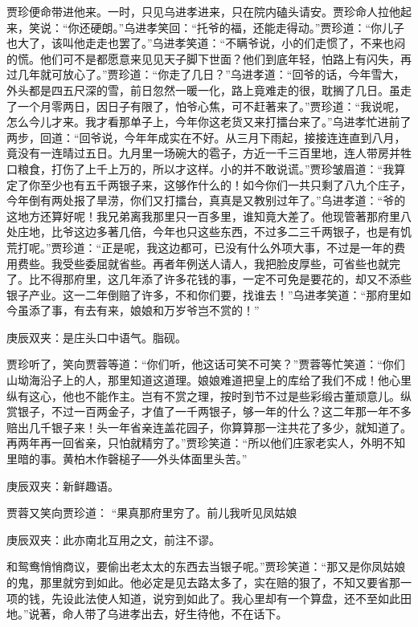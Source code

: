 \begin{parag}
    贾珍便命带进他来。一时，只见乌进孝进来，只在院内磕头请安。贾珍命人拉他起来，笑说：“你还硬朗。”乌进孝笑回：“托爷的福，还能走得动。”贾珍道：“你儿子也大了，该叫他走走也罢了。”乌进孝笑道：“不瞒爷说，小的们走惯了，不来也闷的慌。他们可不是都愿意来见见天子脚下世面？他们到底年轻，怕路上有闪失，再过几年就可放心了。”贾珍道：“你走了几日？”乌进孝道：“回爷的话，今年雪大，外头都是四五尺深的雪，前日忽然一暖一化，路上竟难走的很，耽搁了几日。虽走了一个月零两日，因日子有限了，怕爷心焦，可不赶著来了。”贾珍道：“我说呢，怎么今儿才来。我才看那单子上，今年你这老货又来打擂台来了。”乌进孝忙进前了两步，回道：“回爷说，今年年成实在不好。从三月下雨起，接接连连直到八月，竟没有一连晴过五日。九月里一场碗大的雹子，方近一千三百里地，连人带房并牲口粮食，打伤了上千上万的，所以才这样。小的并不敢说谎。”贾珍皱眉道：“我算定了你至少也有五千两银子来，这够作什么的！如今你们一共只剩了八九个庄子，今年倒有两处报了旱涝，你们又打擂台，真真是又教别过年了。”乌进孝道：“爷的这地方还算好呢！我兄弟离我那里只一百多里，谁知竟大差了。他现管著那府里八处庄地，比爷这边多著几倍，今年也只这些东西，不过多二三千两银子，也是有饥荒打呢。”贾珍道：“正是呢，我这边都可，已没有什么外项大事，不过是一年的费用费些。我受些委屈就省些。再者年例送人请人，我把脸皮厚些，可省些也就完了。比不得那府里，这几年添了许多花钱的事，一定不可免是要花的，却又不添些银子产业。这一二年倒赔了许多，不和你们要，找谁去！”乌进孝笑道：“那府里如今虽添了事，有去有来，娘娘和万岁爷岂不赏的！”\begin{note}庚辰双夹：是庄头口中语气。脂砚。\end{note}贾珍听了，笑向贾蓉等道：“你们听，他这话可笑不可笑？”贾蓉等忙笑道：“你们山坳海沿子上的人，那里知道这道理。娘娘难道把皇上的库给了我们不成！他心里纵有这心，他也不能作主。岂有不赏之理，按时到节不过是些彩缎古董顽意儿。纵赏银子，不过一百两金子，才值了一千两银子，够一年的什么？这二年那一年不多赔出几千银子来！头一年省亲连盖花园子，你算算那一注共花了多少，就知道了。再两年再一回省亲，只怕就精穷了。”贾珍笑道：“所以他们庄家老实人，外明不知里暗的事。黄柏木作磬槌子──外头体面里头苦。”\begin{note}庚辰双夹：新鲜趣语。\end{note}贾蓉又笑向贾珍道： “果真那府里穷了。前儿我听见凤姑娘\begin{note}庚辰双夹：此亦南北互用之文，前注不谬。\end{note}和鸳鸯悄悄商议，要偷出老太太的东西去当银子呢。”贾珍笑道：“那又是你凤姑娘的鬼，那里就穷到如此。他必定是见去路太多了，实在赔的狠了，不知又要省那一项的钱，先设此法使人知道，说穷到如此了。我心里却有一个算盘，还不至如此田地。”说著，命人带了乌进孝出去，好生待他，不在话下。
\end{parag}


